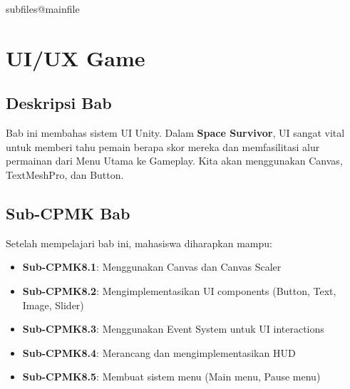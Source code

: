 \documentclass[../../main.tex]{subfiles}
\begin{document}
\ifcsname subfiles@mainfile\endcsname\else
    \setcounter{chapter}{7}
\fi
\chapter{UI/UX Game}

\section{Deskripsi Bab}

Bab ini membahas sistem UI Unity. 
Dalam \textbf{Space Survivor}, UI sangat vital untuk memberi tahu pemain berapa skor mereka dan memfasilitasi alur permainan dari Menu Utama ke Gameplay. Kita akan menggunakan Canvas, TextMeshPro, dan Button.

\section{Sub-CPMK Bab}

Setelah mempelajari bab ini, mahasiswa diharapkan mampu:
\begin{itemize}
\item \textbf{Sub-CPMK8.1}: Menggunakan Canvas dan Canvas Scaler
\item \textbf{Sub-CPMK8.2}: Mengimplementasikan UI components (Button, Text, Image, Slider)
\item \textbf{Sub-CPMK8.3}: Menggunakan Event System untuk UI interactions
\item \textbf{Sub-CPMK8.4}: Merancang dan mengimplementasikan HUD
\item \textbf{Sub-CPMK8.5}: Membuat sistem menu (Main menu, Pause menu)
\end{itemize}









\end{document}
